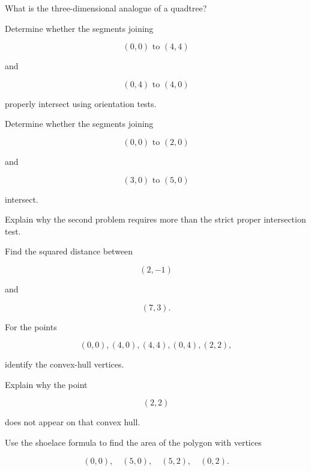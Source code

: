 \begin{exercise}[1]
What is the three-dimensional analogue of a quadtree?
\end{exercise}

\begin{exercise}[2]
Determine whether the segments joining

\[
(0,0)\text{ to }(4,4)
\]

and

\[
(0,4)\text{ to }(4,0)
\]

properly intersect using orientation tests.
\end{exercise}

\begin{exercise}[2]
Determine whether the segments joining

\[
(0,0)\text{ to }(2,0)
\]

and

\[
(3,0)\text{ to }(5,0)
\]

intersect.
\end{exercise}

\begin{exercise}[2]
Explain why the second problem requires more than the strict proper
intersection test.
\end{exercise}

\begin{exercise}[2]
Find the squared distance between

\[
(2,-1)
\]

and

\[
(7,3).
\]
\end{exercise}

\begin{exercise}[2]
For the points

\[
(0,0),
(4,0),
(4,4),
(0,4),
(2,2),
\]

identify the convex-hull vertices.
\end{exercise}

\begin{exercise}[2]
Explain why the point

\[
(2,2)
\]

does not appear on that convex hull.
\end{exercise}

\begin{exercise}[2]
Use the shoelace formula to find the area of the polygon with vertices

\[
(0,0),
\quad
(5,0),
\quad
(5,2),
\quad
(0,2).
\]
\end{exercise}

